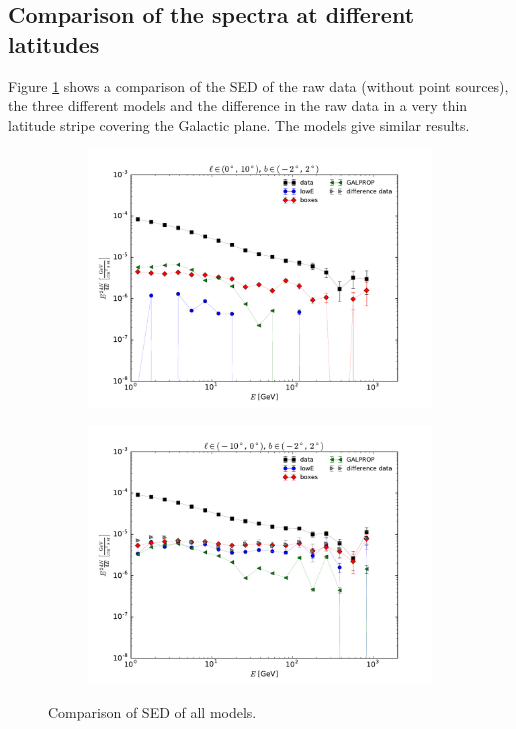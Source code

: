\subsection{Comparison of the spectra at different latitudes}

Figure \ref{fig:SED_all} shows a comparison of the SED of the raw data (without point sources), the three different models and the difference in the raw data in a very thin latitude stripe covering the Galactic plane. The models give similar results. 


\begin{figure}[h!]
    \begin{subfigure}{0.5\textwidth}
        \includegraphics[width=\textwidth]{plots/SED_all_models_source_l=5_b=0.pdf}
    \end{subfigure} 
    \begin{subfigure}{0.5\textwidth}
        \includegraphics[width=\textwidth]{plots/SED_all_models_source_l=-5_b=0.pdf}
    \end{subfigure}
  	\caption{Comparison of SED of all models.}
  	\label{fig:SED_all}
\end{figure}

